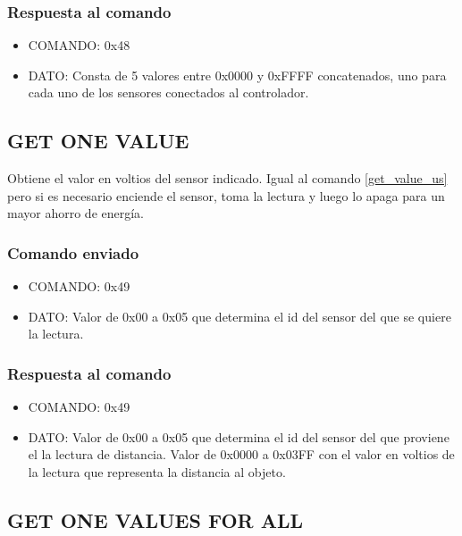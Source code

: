\documentclass[a4paper,10pt]{article}
\begin{document}
\subsubsection*{Respuesta al comando}

\begin{itemize}
	\item{COMANDO:} 0x48
	\item{DATO:} Consta de 5 valores entre 0x0000 y 0xFFFF concatenados, uno para cada uno de los sensores conectados al controlador.
\end{itemize}

\subsection{GET ONE VALUE}
\label{get_one_value_us}

Obtiene el valor en voltios del sensor indicado.
Igual al comando \ref{get_value_us} pero si es necesario enciende el sensor, toma la lectura y luego lo apaga para un mayor ahorro de energ\'ia.

\subsubsection*{Comando enviado}

\begin{itemize}
	\item{COMANDO:} 0x49
	\item{DATO:} Valor de 0x00 a 0x05 que determina el id del sensor del que se quiere la lectura.
\end{itemize}

\subsubsection*{Respuesta al comando}

\begin{itemize}
	\item{COMANDO:} 0x49
	\item{DATO:} Valor de 0x00 a 0x05 que determina el id del sensor del que proviene el la lectura de distancia.
	Valor de 0x0000 a 0x03FF con el valor en voltios de la lectura que representa la distancia al objeto.
\end{itemize}

\subsection{GET ONE VALUES FOR ALL}
\label{get_one_values_for_all_us}
\end{document}
